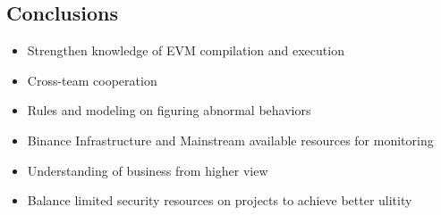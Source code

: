 \documentclass[a0,portrait]{a0poster}
\begin{document}
\begin{multicols}{2}
\vspace{2cm}
\begin{tcolorbox}[width=0.95\linewidth,colback={binanceyellow},frame empty,boxsep=1cm]
\section{Conclusions}
\begin{itemize}
    \item Strengthen knowledge of EVM compilation and execution
    \item Cross-team cooperation
    \item Rules and modeling on figuring abnormal behaviors
    \item Binance Infrastructure and Mainstream available resources for monitoring
    \item Understanding of business from higher view
    \item Balance limited security resources on projects to achieve better ulitity


\end{itemize}
\end{tcolorbox}    




\end{multicols}
\end{document}
